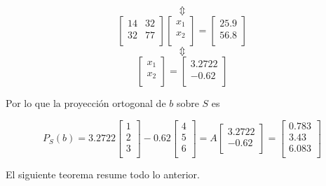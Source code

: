 \begin{ejemplo}
$$\Updownarrow$$
$$
\begin{bmatrix}
	14 & 32 \\
	32 & 77 \\
\end{bmatrix}
\begin{bmatrix}
	x_1 \\
	x_2 \\
\end{bmatrix}
=
\begin{bmatrix}
	25.9 \\
	56.8 \\
\end{bmatrix}
$$
$$\Updownarrow$$
$$
\begin{bmatrix}
	x_1 \\
	x_2 \\
\end{bmatrix}
=
\begin{bmatrix}
	3.2722 \\
	-0.62 \\
\end{bmatrix} $$

Por lo que la proyección ortogonal de $b$ sobre $S$ es

\[ P_S(b) = 3.2722
	\begin{bmatrix}
		1 \\
		2 \\
		3 \\
	\end{bmatrix}
- 0.62
	\begin{bmatrix}
		4 \\
		5 \\
		6 \\
	\end{bmatrix}
= A \begin{bmatrix}
	3.2722 \\
	-0.62 \\
\end{bmatrix}
= \begin{bmatrix}
	0.783 \\
	3.43 \\
	6.083 \\
\end{bmatrix}
\]

\end{ejemplo}

El siguiente teorema resume todo lo anterior.

